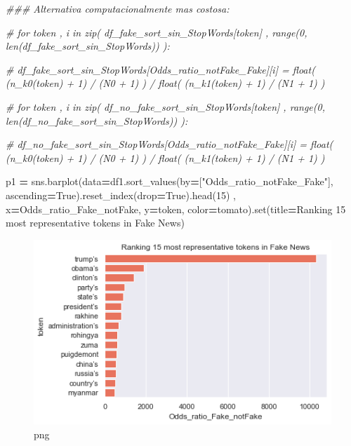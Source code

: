 \documentclass[
  11pt,
  a4paper,
]{article}
\newenvironment{Shaded}{\begin{snugshade}}{\end{snugshade}}
\newcommand{\BuiltInTok}[1]{#1}
\newcommand{\CommentTok}[1]{\textcolor[rgb]{0.56,0.35,0.01}{\textit{#1}}}
\newcommand{\DecValTok}[1]{\textcolor[rgb]{0.00,0.00,0.81}{#1}}
\newcommand{\NormalTok}[1]{#1}
\newcommand{\OperatorTok}[1]{\textcolor[rgb]{0.81,0.36,0.00}{\textbf{#1}}}
\newcommand{\StringTok}[1]{\textcolor[rgb]{0.31,0.60,0.02}{#1}}
\newcommand{\VariableTok}[1]{\textcolor[rgb]{0.00,0.00,0.00}{#1}}
\begin{document}
\begin{Shaded}
\begin{Highlighting}[]
\CommentTok{\#\#\# Alternativa computacionalmente mas costosa:}

\CommentTok{\# for token , i in zip( df\_fake\_sort\_sin\_StopWords[\textquotesingle{}token\textquotesingle{}] , range(0, len(df\_fake\_sort\_sin\_StopWords)) ):}

   \CommentTok{\# df\_fake\_sort\_sin\_StopWords[\textquotesingle{}Odds\_ratio\_notFake\_Fake\textquotesingle{}][i] = float( (n\_k0(token) + 1) / (N0 + 1) ) / float( (n\_k1(token) + 1) / (N1 + 1) )}

\CommentTok{\# for token , i in zip( df\_no\_fake\_sort\_sin\_StopWords[\textquotesingle{}token\textquotesingle{}] , range(0, len(df\_no\_fake\_sort\_sin\_StopWords)) ):}

   \CommentTok{\# df\_no\_fake\_sort\_sin\_StopWords[\textquotesingle{}Odds\_ratio\_notFake\_Fake\textquotesingle{}][i] = float( (n\_k0(token) + 1) / (N0 + 1) ) / float( (n\_k1(token) + 1) / (N1 + 1) )}
\end{Highlighting}
\end{Shaded}

\begin{Shaded}
\begin{Highlighting}[]
\NormalTok{p1 }\OperatorTok{=}\NormalTok{ sns.barplot(data}\OperatorTok{=}\NormalTok{df1.sort\_values(by}\OperatorTok{=}\NormalTok{[}\StringTok{"Odds\_ratio\_notFake\_Fake"}\NormalTok{], ascending}\OperatorTok{=}\VariableTok{True}\NormalTok{).reset\_index(drop}\OperatorTok{=}\VariableTok{True}\NormalTok{).head(}\DecValTok{15}\NormalTok{) ,}
\NormalTok{                 x}\OperatorTok{=}\StringTok{\textquotesingle{}Odds\_ratio\_Fake\_notFake\textquotesingle{}}\NormalTok{, y}\OperatorTok{=}\StringTok{\textquotesingle{}token\textquotesingle{}}\NormalTok{, color}\OperatorTok{=}\StringTok{\textquotesingle{}tomato\textquotesingle{}}\NormalTok{).}\BuiltInTok{set}\NormalTok{(title}\OperatorTok{=}\StringTok{\textquotesingle{}Ranking 15 most representative tokens in Fake News\textquotesingle{}}\NormalTok{) }
\end{Highlighting}
\end{Shaded}

\begin{figure}
\centering
\includegraphics{output_95_0.png}
\caption{png}
\end{figure}
\end{document}
